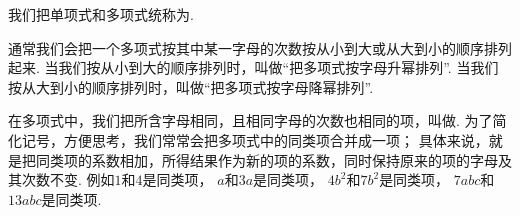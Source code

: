 我们把单项式和多项式统称为.

通常我们会把一个多项式按其中某一字母的次数按从小到大或从大到小的顺序排列起来.
当我们按从小到大的顺序排列时，叫做“把多项式按字母升幂排列”.
当我们按从大到小的顺序排列时，叫做“把多项式按字母降幂排列”.

在多项式中，我们把所含字母相同，且相同字母的次数也相同的项，叫做.
为了简化记号，方便思考，我们常常会把多项式中的同类项合并成一项；
具体来说，就是把同类项的系数相加，所得结果作为新的项的系数，同时保持原来的项的字母及其次数不变.
例如\(1\)和\(4\)是同类项，
\(a\)和\(3a\)是同类项，
\(4b^2\)和\(7b^2\)是同类项，
\(7abc\)和\(13abc\)是同类项.

